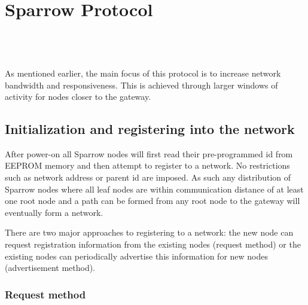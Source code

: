 
\chapter{Sparrow Protocol}

\\
\\
\\

As mentioned earlier, the main focus of this protocol is to increase network
bandwidth and responsiveness. This is achieved through larger windows of
activity for nodes closer to the gateway. 

\section{Initialization and registering into the network}

After power-on all Sparrow nodes will first read their pre-programmed id from
\mbox{EEPROM} memory and then attempt to register to a network. No restrictions
such as network address or parent id are imposed. As such any distribution of
Sparrow nodes where all leaf nodes are within communication distance of at
least one root node and a path can be formed from any root node to the gateway
will eventually form a network. 

There are two major approaches to registering to a network: the new node can
request registration information from the existing nodes (request method) or
the existing nodes can periodically advertise this information for new nodes
(advertisement method). 

\subsection{Request method}

